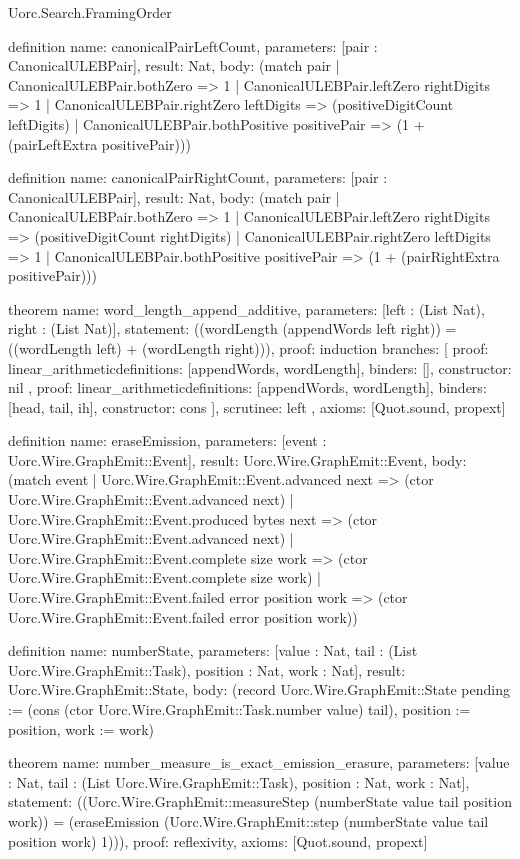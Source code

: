 \begin{lexlean}{Uorc.Search.FramingOrder}
\begin{semanticmodule}
definition{
  name: canonicalPairLeftCount,
  parameters: [pair : CanonicalULEBPair],
  result: Nat,
  body: (match pair
    | CanonicalULEBPair.bothZero => 1
    | CanonicalULEBPair.leftZero rightDigits => 1
    | CanonicalULEBPair.rightZero leftDigits => (positiveDigitCount leftDigits)
    | CanonicalULEBPair.bothPositive positivePair => (1 + (pairLeftExtra positivePair)))
}

definition{
  name: canonicalPairRightCount,
  parameters: [pair : CanonicalULEBPair],
  result: Nat,
  body: (match pair
    | CanonicalULEBPair.bothZero => 1
    | CanonicalULEBPair.leftZero rightDigits => (positiveDigitCount rightDigits)
    | CanonicalULEBPair.rightZero leftDigits => 1
    | CanonicalULEBPair.bothPositive positivePair => (1 + (pairRightExtra positivePair)))
}

theorem{
  name: word_length_append_additive,
  parameters: [left : (List Nat), right : (List Nat)],
  statement: ((wordLength (appendWords left right)) = ((wordLength left) + (wordLength right))),
  proof: induction{
    branches: [
      {
        proof: linear_arithmetic{definitions: [appendWords, wordLength]},
        binders: [],
        constructor: nil
      },
      {
        proof: linear_arithmetic{definitions: [appendWords, wordLength]},
        binders: [head, tail, ih],
        constructor: cons
      }
    ],
    scrutinee: left
  },
  axioms: [Quot.sound, propext]
}

definition{
  name: eraseEmission,
  parameters: [event : Uorc.Wire.GraphEmit::Event],
  result: Uorc.Wire.GraphEmit::Event,
  body: (match event
    | Uorc.Wire.GraphEmit::Event.advanced next => (ctor Uorc.Wire.GraphEmit::Event.advanced next)
    | Uorc.Wire.GraphEmit::Event.produced bytes next => (ctor Uorc.Wire.GraphEmit::Event.advanced next)
    | Uorc.Wire.GraphEmit::Event.complete size work => (ctor Uorc.Wire.GraphEmit::Event.complete size work)
    | Uorc.Wire.GraphEmit::Event.failed error position work => (ctor Uorc.Wire.GraphEmit::Event.failed error position work))
}

definition{
  name: numberState,
  parameters: [value : Nat, tail : (List Uorc.Wire.GraphEmit::Task), position : Nat, work : Nat],
  result: Uorc.Wire.GraphEmit::State,
  body: (record Uorc.Wire.GraphEmit::State {pending := (cons (ctor Uorc.Wire.GraphEmit::Task.number value) tail), position := position, work := work})
}

theorem{
  name: number_measure_is_exact_emission_erasure,
  parameters: [value : Nat, tail : (List Uorc.Wire.GraphEmit::Task), position : Nat, work : Nat],
  statement: ((Uorc.Wire.GraphEmit::measureStep (numberState value tail position work)) = (eraseEmission (Uorc.Wire.GraphEmit::step (numberState value tail position work) 1))),
  proof: reflexivity{},
  axioms: [Quot.sound, propext]
}


\end{semanticmodule}
\end{lexlean}
